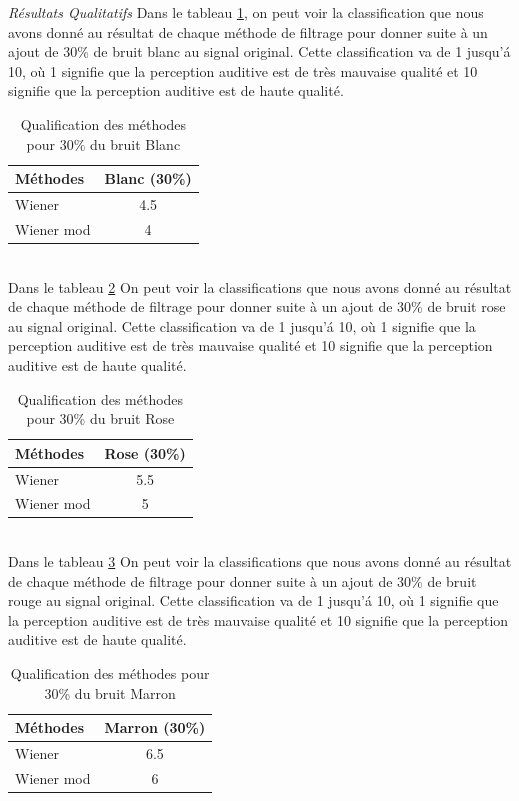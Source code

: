 \documentclass[conference,onecolumn]{IEEEtran}
\begin{document}
\textit{Résultats Qualitatifs}
Dans le tableau \ref{table:t19}, on peut voir la classification que nous avons donné au résultat de chaque méthode de filtrage pour donner suite à un ajout de 30\% de bruit blanc au signal original. Cette classification va de 1 jusqu'á 10, où 1 signifie que la perception auditive est de très mauvaise qualité et 10 signifie que la perception auditive est de haute qualité.
\begin{table}[H]
    \centering
    \begin{tabular}{ l  c }
    \textbf{Méthodes} & \textbf{Blanc (30\%)} \\
    \hline
   Wiener &  4.5 \\
    Wiener mod & 4  \\
    \end{tabular}
    \caption{Qualification des méthodes pour 30\% du bruit Blanc}
    \label{table:t19}
\end{table}
\hfill \\
Dans le tableau \ref{table:t20} On peut voir la classifications que nous avons donné au résultat de chaque méthode de filtrage pour donner suite à un ajout de 30\% de bruit rose au signal original. Cette classification va de 1 jusqu'á 10, où 1 signifie que la perception auditive est de très mauvaise qualité et 10 signifie que la perception auditive est de haute qualité.  
\begin{table}[H]
    \centering
    \begin{tabular}{ l  c }
    \textbf{Méthodes} & \textbf{Rose (30\%)} \\
    \hline
    Wiener & 5.5 \\
    Wiener mod &  5 \\
    \end{tabular}
    \caption{Qualification des méthodes pour 30\% du bruit Rose}
    \label{table:t20}
\end{table}
\hfill \\
Dans le tableau \ref{table:t21} On peut voir la classifications que nous avons donné au résultat de chaque méthode de filtrage pour donner suite à un ajout de 30\% de bruit rouge au signal original. Cette classification va de 1 jusqu'á 10, où 1 signifie que la perception auditive est de très mauvaise qualité et 10 signifie que la perception auditive est de haute qualité.
\begin{table}[H]
    \centering
    \begin{tabular}{ l  c }
    \textbf{Méthodes} & \textbf{Marron (30\%)} \\
    \hline
    Wiener & 6.5 \\
    Wiener mod &  6 \\
    \end{tabular}
    \caption{Qualification des méthodes pour 30\% du bruit Marron}
    \label{table:t21}
\end{table}
\end{document}
